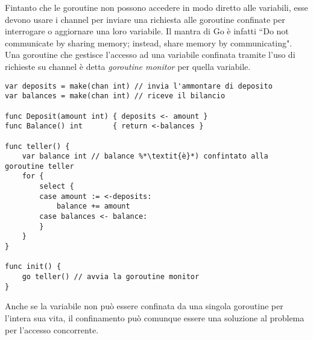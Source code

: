 \documentclass[../../thesis.tex]{subfiles}
\begin{document}
    Fintanto che le goroutine non possono accedere in modo diretto alle variabili, esse devono usare i channel per inviare una richiesta alle goroutine confinate per interrogare o aggiornare una loro variabile.
    Il mantra di Go è infatti ``Do not communicate by sharing memory;
    instead, share memory by communicating".
    Una goroutine che gestisce l'accesso ad una variabile confinata tramite l'uso di richieste su channel è detta \textit{goroutine monitor} per quella variabile.
    \begin{lstlisting}[frame = single,label={lst:lstlisting9-1.6}]
var deposits = make(chan int) // invia l'ammontare di deposito
var balances = make(chan int) // riceve il bilancio

func Deposit(amount int) { deposits <- amount }
func Balance() int       { return <-balances }

func teller() {
    var balance int // balance %*\textit{è}*) confintato alla goroutine teller
    for {
        select {
        case amount := <-deposits:
            balance += amount
        case balances <- balance:
        }
    }
}

func init() {
    go teller() // avvia la goroutine monitor
}
    \end{lstlisting}
    Anche se la variabile non può essere confinata da una singola goroutine per l'intera sua vita, il confinamento può comunque essere una soluzione al problema per l'accesso concorrente.
\end{document}
